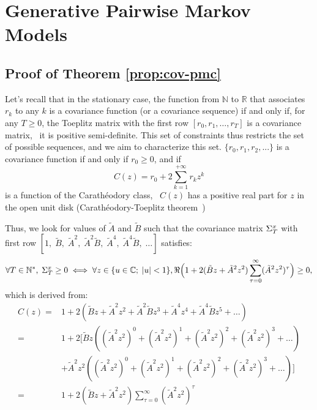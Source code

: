 \chapter{Generative Pairwise Markov Models}
\label{chap:appendix_22}

\tocless\section{Proof of Theorem \ref{prop:cov-pmc}}


Let's recall that in the stationary case, the function from $\mathbb{N}$ to
$\mathbb{R}$ that associates $r_k$ to any $k$ is a covariance function (or a
covariance sequence) if and only if, for any $T \geq 0$, 
the Toeplitz matrix
with the first row  $[r_0, r_1, \ldots,r_T]$ is a covariance matrix, \ie~it is
positive semi-definite. This set of constraints thus restricts the set of
possible sequences, and we aim to characterize this set.  
 $\{r_0, r_1, r_2, ...\}$ is a covariance function if and
only if $r_0 \geq 0$,  and  if
\[ C(z) = r_0 + 2 \sum_{k=1}^{+\infty} r_k z^k \]
is a function of the Carathéodory class, \ie~$C(z)$ has a positive real part
for $z$ in the open unit disk 
(Carathéodory-Toeplitz theorem~\citep{akhiezer1965classical})



Thus, we look for values of $\tilde{A}$ and $\tilde{B}$ such that the 
covariance matrix $\Sigma^{x}_{T}$ with first row
$[1,\; \tilde{B},\; \tilde{A}^2,\; \tilde{A}^2\tilde{B},\; \tilde{A}^4,\; \tilde{A}^4\tilde{B},\; \dots ]$
 satisfies:
\begin{equation*}
  \forall T \in \mathbb{N}^*, \; \Sigma^{x}_{T} \geq 0 \iff \forall z \in 
  \{ u \in \mathbb{C}; \; |u|<1 \}, \Re\Big( 1+ 2(\tilde{B}z + \tilde{A}^2z^2) 
  \sum_{\tau=0}^{\infty}(\tilde{A}^2z^2)^\tau \Big) \geq 0 \text{,}
\end{equation*}
which is derived from:
\begin{align*}
  C(z) = & 1 + 2 ( \tilde{B}z +  \tilde{A}^2z^2 + \tilde{A}^2\tilde{B}z^3 +  \tilde{A}^4z^4 + \tilde{A}^4\tilde{B}z^5 + \dots) \\
  = & 1 + 2 \big[\tilde{B}z ((\tilde{A}^2z^2)^0  + (\tilde{A}^2z^2)^1 + (\tilde{A}^2z^2)^2 + (\tilde{A}^2z^2)^3 + \dots)\\
  & +  \tilde{A}^2z^2 ((\tilde{A}^2z^2)^0  + (\tilde{A}^2z^2)^1 + (\tilde{A}^2z^2)^2 + (\tilde{A}^2z^2)^3 + \dots) \big ]  \\
  = & 1 + 2(\tilde{B}z + \tilde{A}^2z^2) \sum_{\tau=0}^{\infty}(\tilde{A}^2z^2)^\tau
\end{align*}

